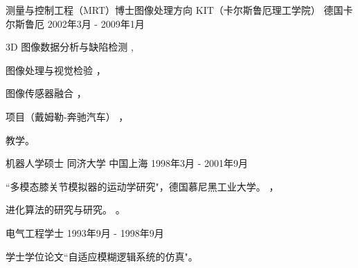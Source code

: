 \documentclass[../cv_cn.tex]{subfiles}
\begin{document}
\begin{cventries}
  \cventry
    {测量与控制工程（MRT）博士\quad 图像处理方向} %
    {KIT（卡尔斯鲁厄理工学院）} %
    {德国卡尔斯鲁厄} %
    {2002年3月 - 2009年1月} %
    {
      \begin{cvitems} %
        \item 3D 图像数据分析与缺陷检测 \supercite{xin2008diss},
        \item 图像处理与视觉检验 \supercite{xin2009multiscale} \supercite{xin2007evaluation}，
        \item 图像传感器融合 \supercite{xin2004bildfolgenauswertung}，
        \item 项目（戴姆勒-奔驰汽车） \supercite{Xin_Daimler_08}，
        \item 教学。
      \end{cvitems}
    }

  \cventry
    {机器人学硕士} %
    {同济大学} %
    {中国上海} %
    {1998年3月 - 2001年9月} %
    {
      \begin{cvitems} %
        \item ``多模态膝关节模拟器的运动学研究"，德国慕尼黑工业大学。 \supercite{xin2002KneeSimulator}，
        \item 进化算法的研究与研究。 \supercite{xin2002AntColony}。
      \end{cvitems}
    }

  \cventry
    {电气工程学士} %
    {} %
    {} %
    {1993年9月 - 1998年9月} %
    {
      \begin{cvitems} %
        \item 学士学位论文``自适应模糊逻辑系统的仿真"。
      \end{cvitems}
    }

\end{cventries}
\end{document}
